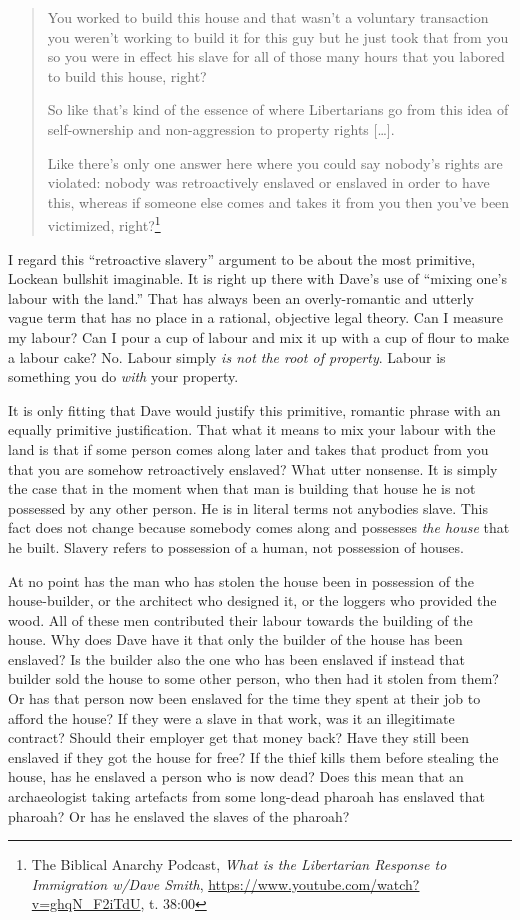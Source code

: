 \documentclass[11pt]{article}
\begin{document}
\begin{quote}
You worked to build this house and that wasn't a voluntary transaction you weren't working to build it for this guy but he just took that from you so you were in effect his slave for all of those many hours that you labored to build this house, right?

So like that's kind of the essence of where Libertarians go from this idea of self-ownership and non-aggression to property rights [\ldots{}].

Like there's only one answer here where you could say nobody's rights are violated: nobody was retroactively enslaved or enslaved in order to have this, whereas if someone else comes and takes it from you then you've been victimized, right?\footnote{The Biblical Anarchy Podcast, \emph{What is the Libertarian Response to Immigration w/Dave Smith}, \url{https://www.youtube.com/watch?v=ghqN\_F2iTdU}, t. 38:00}
\end{quote}

I regard this ``retroactive slavery'' argument to be about the most primitive, Lockean bullshit imaginable. It is right up there with Dave's use of ``mixing one's labour with the land.'' That has always been an overly-romantic and utterly vague term that has no place in a rational, objective legal theory. Can I measure my labour? Can I pour a cup of labour and mix it up with a cup of flour to make a labour cake? No. Labour simply \emph{is not the root of property}. Labour is something you do \emph{with} your property.

It is only fitting that Dave would justify this primitive, romantic phrase with an equally primitive justification. That what it means to mix your labour with the land is that if some person comes along later and takes that product from you that you are somehow retroactively enslaved? What utter nonsense. It is simply the case that in the moment when that man is building that house he is not possessed by any other person. He is in literal terms not anybodies slave. This fact does not change because somebody comes along and possesses \emph{the house} that he built. Slavery refers to possession of a human, not possession of houses.

At no point has the man who has stolen the house been in possession of the house-builder, or the architect who designed it, or the loggers who provided the wood. All of these men contributed their labour towards the building of the house. Why does Dave have it that only the builder of the house has been enslaved? Is the builder also the one who has been enslaved if instead that builder sold the house to some other person, who then had it stolen from them? Or has that person now been enslaved for the time they spent at their job to afford the house? If they were a slave in that work, was it an illegitimate contract? Should their employer get that money back? Have they still been enslaved if they got the house for free? If the thief kills them before stealing the house, has he enslaved a person who is now dead? Does this mean that an archaeologist taking artefacts from some long-dead pharoah has enslaved that pharoah? Or has he enslaved the slaves of the pharoah?
\end{document}
